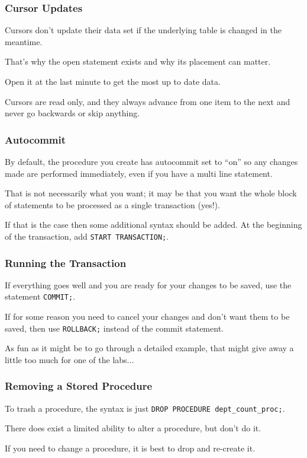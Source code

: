 \begin{frame}
\frametitle{Cursor Updates}

Cursors don't update their data set if the underlying table is changed in the meantime. 

That's why the open statement exists and why its placement can matter. 

Open it at the last minute to get the most up to date data. 

Cursors are read only, and they always advance from one item to the next and never go backwards or skip anything.

\end{frame}

\begin{frame}
\frametitle{Autocommit}

By default, the procedure you create has autocommit set to ``on'' so any changes made are performed immediately, even if you have a multi line statement. 

That is not necessarily what you want; it may be that you want the whole block of statements to be processed as a single transaction (yes!). 

If that is the case then some additional syntax should be added. At the beginning of the transaction, add \texttt{START TRANSACTION;}.


\end{frame}

\begin{frame}
\frametitle{Running the Transaction}

If everything goes well and you are ready for your changes to be saved, use the statement \texttt{COMMIT;}. 

If for some reason you need to cancel your changes and don't want them to be saved, then use \texttt{ROLLBACK;} instead of the commit statement. 

As fun as it might be to go through a detailed example, that might give away a little too much for one of the labs...

\end{frame}

\begin{frame}
\frametitle{Removing a Stored Procedure}

To trash a procedure, the syntax is just \texttt{DROP PROCEDURE dept\_count\_proc;}. 

There does exist a limited ability to alter a procedure, but don't do it. 

If you need to change a procedure, it is best to drop and re-create it.

\end{frame}

